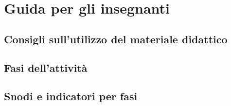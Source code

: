 \chapter{Guida per gli insegnanti}

\section{Consigli sull'utilizzo del materiale didattico}

\section{Fasi dell'attività}

\section{Snodi e indicatori per fasi}